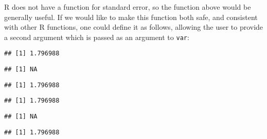 \documentclass[paper=a4,10pt,div=17,headsepline,BCOR=12mm,twoside,open=right]{scrbook}\usepackage{knitr}
\begin{document}
R does not have a function for standard error, so the function above would be generally useful. If we would like to make this function both safe, and consistent with other R functions, one could define it as follows, allowing the user to provide a second argument which is passed as an argument to \texttt{var}:

\begin{knitrout}\footnotesize
{}\color{fgcolor}\begin{kframe}
\begin{alltt}
 \hlkwb{<-} \hlstd{(}\hlstd{,} \hlstd{=}\hlstd{)\{}\hlstd{(} \hlopt{/}\hlstd{(}
\end{alltt}
\begin{verbatim}
## [1] 1.796988
\end{verbatim}
\begin{alltt}
\end{alltt}
\begin{verbatim}
## [1] NA
\end{verbatim}
\begin{alltt}
 \hlstd{)}
\end{alltt}
\begin{verbatim}
## [1] 1.796988
\end{verbatim}
\begin{alltt}
\hlstd{(} \hlstd{=}\hlstd{)}
\end{alltt}
\begin{verbatim}
## [1] 1.796988
\end{verbatim}
\begin{alltt}
\hlstd{(}
\end{alltt}


{\ttfamily\noindent{}}\begin{verbatim}
## [1] NA
\end{verbatim}
\begin{alltt}
\hlstd{(}\hlstd{=}\hlstd{,} 
\end{alltt}
\begin{verbatim}
## [1] 1.796988
\end{verbatim}
\end{kframe}
\end{knitrout}
\end{document}
